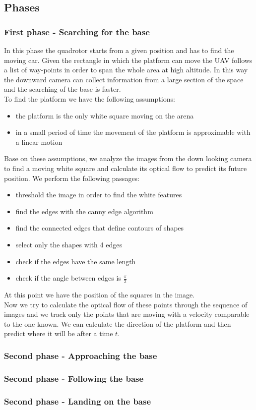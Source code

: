 \subsection{Phases}
\subsubsection{First phase - Searching for the base}
In this phase the quadrotor starts from a given position and has to find the moving car.
Given the rectangle in which the platform can move the UAV follows a list of way-points in order to span the whole area at high altitude. In this way the downward camera can collect information from a large section of the space and the searching of the base is faster.\\
To find the platform we have the following assumptions:
\begin{itemize}
\item the platform is the only white square moving on the arena
\item in a small period of time the movement of the platform is approximable with a linear motion  
\end{itemize}

Base on these assumptions, we analyze the images from the down looking camera to find a moving white square and calculate its optical flow to predict its future position.
We perform the following passages:
\begin{itemize}
\item threshold the image in order to find the white features
\item find the edges with the canny edge algorithm
\item find the connected edges that define contours of shapes
\item select only the shapes with 4 edges
\item check if the edges have the same length 
\item check if the angle between edges is $\frac{\pi}{2}$
\end{itemize}
At this point we have the position of the squares in the image.\\
Now we try to calculate the optical flow of these points through the sequence of images and we track only the points that are moving with a velocity comparable to the one known. We can calculate the direction of the platform and then predict where it will be after a time $t$.
 

\subsubsection{Second phase - Approaching the base}

\subsubsection{Second phase - Following the base}

\subsubsection{Second phase - Landing on the base}

